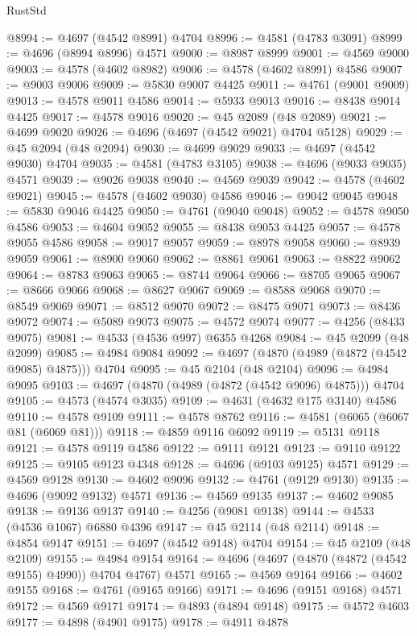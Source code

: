 \begin{lexlean}{RustStd}
\begin{coremodule}
@8994 := @4697 (@4542 @8991) @4704
@8996 := @4581 (@4783 @3091)
@8999 := @4696 (@8994 @8996) @4571
@9000 := @8987 @8999
@9001 := @4569 @9000
@9003 := @4578 (@4602 @8982)
@9006 := @4578 (@4602 @8991) @4586
@9007 := @9003 @9006
@9009 := @5830 @9007 @4425
@9011 := @4761 (@9001 @9009)
@9013 := @4578 @9011 @4586
@9014 := @5933 @9013
@9016 := @8438 @9014 @4425
@9017 := @4578 @9016
@9020 := @45 @2089 (@48 @2089)
@9021 := @4699 @9020
@9026 := @4696 (@4697 (@4542 @9021) @4704 @5128)
@9029 := @45 @2094 (@48 @2094)
@9030 := @4699 @9029
@9033 := @4697 (@4542 @9030) @4704
@9035 := @4581 (@4783 @3105)
@9038 := @4696 (@9033 @9035) @4571
@9039 := @9026 @9038
@9040 := @4569 @9039
@9042 := @4578 (@4602 @9021)
@9045 := @4578 (@4602 @9030) @4586
@9046 := @9042 @9045
@9048 := @5830 @9046 @4425
@9050 := @4761 (@9040 @9048)
@9052 := @4578 @9050 @4586
@9053 := @4604 @9052
@9055 := @8438 @9053 @4425
@9057 := @4578 @9055 @4586
@9058 := @9017 @9057
@9059 := @8978 @9058
@9060 := @8939 @9059
@9061 := @8900 @9060
@9062 := @8861 @9061
@9063 := @8822 @9062
@9064 := @8783 @9063
@9065 := @8744 @9064
@9066 := @8705 @9065
@9067 := @8666 @9066
@9068 := @8627 @9067
@9069 := @8588 @9068
@9070 := @8549 @9069
@9071 := @8512 @9070
@9072 := @8475 @9071
@9073 := @8436 @9072
@9074 := @5089 @9073
@9075 := @4572 @9074
@9077 := @4256 (@8433 @9075)
@9081 := @4533 (@4536 @997) @6355 @4268
@9084 := @45 @2099 (@48 @2099)
@9085 := @4984 @9084
@9092 := @4697 (@4870 (@4989 (@4872 (@4542 @9085) @4875))) @4704
@9095 := @45 @2104 (@48 @2104)
@9096 := @4984 @9095
@9103 := @4697 (@4870 (@4989 (@4872 (@4542 @9096) @4875))) @4704
@9105 := @4573 (@4574 @3035)
@9109 := @4631 (@4632 @175 @3140) @4586
@9110 := @4578 @9109
@9111 := @4578 @8762
@9116 := @4581 (@6065 (@6067 @81 (@6069 @81)))
@9118 := @4859 @9116 @6092
@9119 := @5131 @9118
@9121 := @4578 @9119 @4586
@9122 := @9111 @9121
@9123 := @9110 @9122
@9125 := @9105 @9123 @4348
@9128 := @4696 (@9103 @9125) @4571
@9129 := @4569 @9128
@9130 := @4602 @9096
@9132 := @4761 (@9129 @9130)
@9135 := @4696 (@9092 @9132) @4571
@9136 := @4569 @9135
@9137 := @4602 @9085
@9138 := @9136 @9137
@9140 := @4256 (@9081 @9138)
@9144 := @4533 (@4536 @1067) @6880 @4396
@9147 := @45 @2114 (@48 @2114)
@9148 := @4854 @9147
@9151 := @4697 (@4542 @9148) @4704
@9154 := @45 @2109 (@48 @2109)
@9155 := @4984 @9154
@9164 := @4696 (@4697 (@4870 (@4872 (@4542 @9155) @4990)) @4704 @4767) @4571
@9165 := @4569 @9164
@9166 := @4602 @9155
@9168 := @4761 (@9165 @9166)
@9171 := @4696 (@9151 @9168) @4571
@9172 := @4569 @9171
@9174 := @4893 (@4894 @9148)
@9175 := @4572 @4603
@9177 := @4898 (@4901 @9175)
@9178 := @4911 @4878

\end{coremodule}
\end{lexlean}
